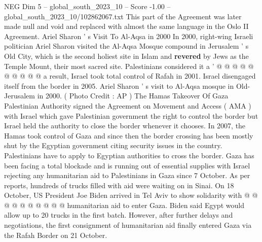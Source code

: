 \begin{textsample}{NEG Dim 5 – global\_south\_2023\_10 – Score -1.00 – global\_south\_2023\_10/102862067.txt}
This part of the Agreement was later made null and void and replaced with almost the same language in the Oslo II Agreement.
Ariel Sharon ' s Visit To Al-Aqsa in 2000 In 2000, right-wing Israeli politician Ariel Sharon visited the Al-Aqsa Mosque compound in Jerusalem ' s Old City, which is the second holiest site in Islam and \textbf{revered} by Jews as the Temple Mount, their most sacred site.
Palestinians considered it a ' @ @ @ @ @ @ @ @ @ @ a result, Israel took total control of Rafah in 2001.
Israel disengaged itself from the border in 2005.
Ariel Sharon ' s visit to Al-Aqsa mosque in Old-Jerusalem in 2000. ( Photo Credit : AP ) The Hamas Takeover Of Gaza Palestinian Authority signed the Agreement on Movement and Access ( AMA ) with Israel which gave Palestinian government the right to control the border but Israel held the authority to close the border whenever it chooses.
In 2007, the Hamas took control of Gaza and since then the border crossing has been mostly shut by the Egyptian government citing security issues in the country.
Palestinians have to apply to Egyptian authorities to cross the border.
Gaza has been facing a total blockade and is running out of essential supplies with Israel rejecting any humanitarian aid to Palestinians in Gaza since 7 October.
As per reports, hundreds of trucks filled with aid were waiting on in Sinai.
On 18 October, US President Joe Biden arrived in Tel Aviv to show solidarity with @ @ @ @ @ @ @ @ @ @ humanitarian aid to enter Gaza.
Biden said Egypt would allow up to 20 trucks in the first batch.
However, after further delays and negotiations, the first consignment of humanitarian aid finally entered Gaza via the Rafah Border on 21 October.

\end{textsample}
